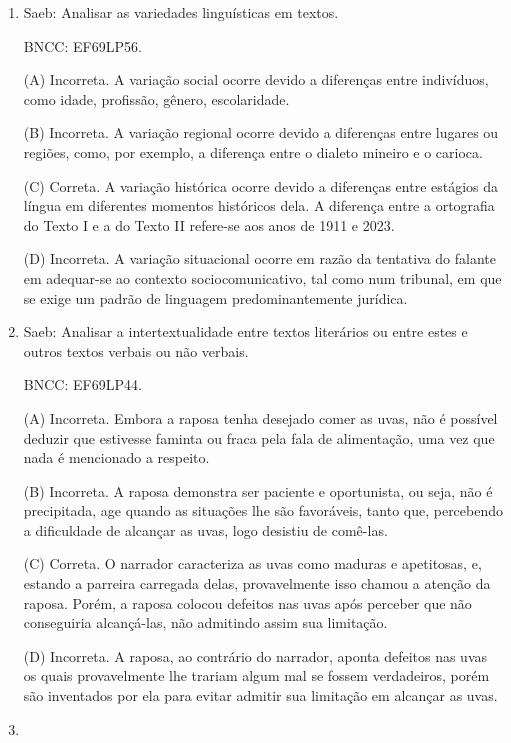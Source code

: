 \begin{enumerate}

	\item
Saeb: Analisar as variedades linguísticas em textos.

BNCC: EF69LP56.

(A) Incorreta. A variação social ocorre devido a diferenças entre
indivíduos, como idade, profissão, gênero, escolaridade.

(B) Incorreta. A variação regional ocorre devido a diferenças entre
lugares ou regiões, como, por exemplo, a diferença entre o dialeto
mineiro e o carioca.

(C) Correta. A variação histórica ocorre devido a diferenças entre
estágios da língua em diferentes momentos históricos dela. A diferença
entre a ortografia do Texto I e a do Texto II refere-se aos anos de 1911 e
2023.

(D) Incorreta. A variação situacional ocorre em razão da tentativa do
falante em adequar-se ao contexto sociocomunicativo, tal como num
tribunal, em que se exige um padrão de linguagem predominantemente
jurídica.

\item

Saeb: Analisar a intertextualidade entre textos literários ou entre
estes e outros textos verbais ou não verbais.

BNCC: EF69LP44.

(A) Incorreta. Embora a raposa tenha desejado comer as uvas, não é
possível deduzir que estivesse faminta ou fraca pela fala de
alimentação, uma vez que nada é mencionado a respeito.

(B) Incorreta. A raposa demonstra ser paciente e oportunista, ou seja,
não é precipitada, age quando as situações lhe são favoráveis, tanto que,
percebendo a dificuldade de alcançar as uvas, logo desistiu de comê-las.

(C) Correta. O narrador caracteriza as uvas como maduras e apetitosas,
e, estando a parreira carregada delas, provavelmente isso chamou a
atenção da raposa. Porém, a raposa colocou defeitos nas uvas após
perceber que não conseguiria alcançá-las, não admitindo assim sua
limitação.

(D) Incorreta. A raposa, ao contrário do narrador, aponta defeitos nas
uvas os quais provavelmente lhe trariam algum mal se fossem verdadeiros,
porém são inventados por ela para evitar admitir sua limitação em
alcançar as uvas.

\item


\end{enumerate}

